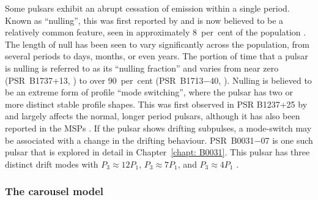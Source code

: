Some pulsars exhibit an abrupt cessation of emission within a single period. Known as ``nulling'', this was first reported by \citet{Bxxx1970b} and is now believed to be a relatively common feature, seen in approximately 8~per~cent of the population \citep[e.g.][]{Rxxx1976, Bxxx1992, LWxx1995,  WMJx2007, GJKx2012, SMxx2021}. The length of null has been seen to vary significantly across the population, from several periods to days, months, or even years.  The portion of time that a pulsar is nulling is referred to as its ``nulling fraction'' and varies from near zero (PSR~B1737+13, \citealt{Bxxx1992}) to over 90~per~cent (PSR~B1713$-$40, \citealt{WMJx2007}). Nulling is believed to be an extreme form of profile ``mode switching'', where the pulsar has two or more distinct stable profile shapes. This was first observed in PSR B1237+25 by \citep{Bxxx1970b} and largely affects the normal, longer period pulsars, although it has also been reported in the MSPs \citep[e.g][]{KLL+1999,MKMP2018, BMRx2019}. If the pulsar shows drifting subpulses, a mode-switch may be associated with a change in the drifting behaviour. PSR~B0031$-$07 is one such pulsar that is explored in detail in Chapter~\ref{chapt: B0031}. This pulsar has three distinct drift modes with $P_3 \approx 12 P_1$, $P_3 \approx 7 P_1$, and $P_3 \approx 4 P_1$ \citep{HTTx1970, VKxx1997,SMKx2005, SMS+2007, MBT+2017,MBW+2019}.





\subsubsection*{The carousel model}
\label{sec: intro - emission models - single pulse phenomena - carousel model}

